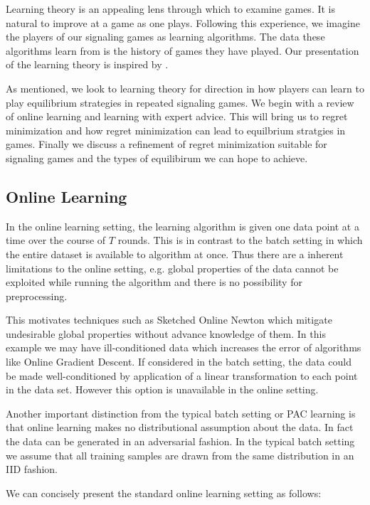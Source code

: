 \documentclass{article}
\begin{document}
Learning theory is an appealing lens through which to examine games. It is natural to improve at a game as one plays. Following this experience, we imagine the players of our signaling games as learning algorithms. The data these algorithms learn from is the history of games they have played. Our presentation of the learning theory is inspired by \cite{mohri2012foundations}. 

As mentioned, we look to learning theory for direction in how players can learn to play equilibrium strategies in repeated signaling games. We begin with a review of online learning and learning with expert advice. This will bring us to regret minimization and how regret minimization can lead to equilbrium stratgies in games. Finally we discuss a refinement of regret minimization suitable for signaling games and the types of equilibirum we can hope to achieve.


\subsection{Online Learning}

In the online learning setting, the learning algorithm is given one data point at a time over the course of $T$ rounds. This is in contrast to the batch setting in which the entire dataset is available to algorithm at once. Thus there are a inherent limitations to the online setting, e.g. global properties of the data cannot be exploited while running the algorithm and there is no possibility for preprocessing.

This motivates techniques such as Sketched Online Newton\cite{luo2016efficient} which mitigate undesirable global properties without advance knowledge of them. In this example we may have ill-conditioned data which increases the error of algorithms like Online Gradient Descent\cite{zinkevich2003online}. If considered in the batch setting, the data could be made well-conditioned by application of a linear transformation to each point in the data set. However this option is unavailable in the online setting.

Another important distinction from the typical batch setting or PAC learning\cite{valiant1984theory} is that online learning makes no distributional assumption about the data. In fact the data can be generated in an adversarial fashion. In the typical batch setting we assume that all training samples are drawn from the same distribution in an IID fashion.

We can concisely present the standard online learning setting as follows:
\end{document}
